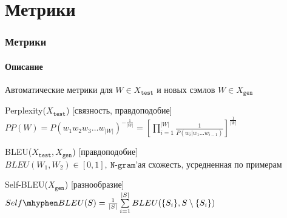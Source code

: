 \documentclass[10pt]{beamer}
\newcommand{\X}[1]{X_{\texttt{#1}}}
\newcommand{\Xtest}{\X{test}}
\newcommand{\Xgen}{\X{gen}}
\begin{document}
\section{Метрики}
\begin{frame}
\frametitle{Метрики}
\framesubtitle{Описание}


Автоматические метрики для $W \in \Xtest$ и новых сэмлов $W \in \Xgen$
\begin{block}{Perplexity($\Xtest$) [связность, правдоподобие]}
    $PP(W) = P(w_1w_2w_3\dots w_{|W|})^{-\frac{1}{|W|}} = \left[\prod\limits_{i=1}^{|W|}{\frac{1}{P(w_i|w_1\dots w_{i-1})}}\right]^{\frac{1}{|W|}}$
\end{block}
\begin{block}{BLEU($\Xtest, \Xgen$) [правдоподобие]}
    $BLEU(W_1, W_2) \in [0, 1], ~ \texttt{N-gram'ая схожесть, усредненная по примерам}$
\end{block}
\begin{block}{Self-BLEU($\Xgen$) [разнообразие]}
    $Self \mhyphen BLEU(S) = \frac{1}{|S|} \sum\limits^{|S|}_{i=1}{BLEU(\{S_i\}, S \setminus \{S_i\})}$
\end{block}

\end{frame}
\end{document}

